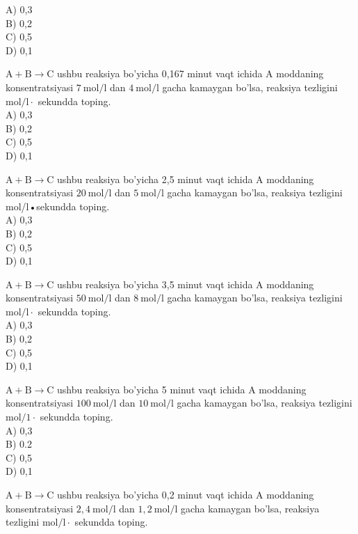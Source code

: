 A) 0,3\\
B) 0,2\\
C) 0,5\\
D) 0,1
  \item $\mathrm{A}+\mathrm{B} \rightarrow \mathrm{C}$ ushbu reaksiya bo'yicha 0,167 minut vaqt ichida A moddaning konsentratsiyasi $7 \mathrm{~mol} / \mathrm{l}$ dan $4 \mathrm{~mol} / \mathrm{l}$ gacha kamaygan bo'lsa, reaksiya tezligini $\mathrm{mol} / \mathrm{l} \cdot$ sekundda toping.\\
A) 0,3\\
B) 0,2\\
C) 0,5\\
D) 0,1
  \item $\mathrm{A}+\mathrm{B} \rightarrow \mathrm{C}$ ushbu reaksiya bo'yicha 2,5 minut vaqt ichida A moddaning konsentratsiyasi $20 \mathrm{~mol} / \mathrm{l}$ dan $5 \mathrm{~mol} / \mathrm{l}$ gacha kamaygan bo'lsa, reaksiya tezligini mol/l•sekundda toping.\\
A) 0,3\\
B) 0,2\\
C) 0,5\\
D) 0,1
  \item $\mathrm{A}+\mathrm{B} \rightarrow \mathrm{C}$ ushbu reaksiya bo'yicha 3,5 minut vaqt ichida A moddaning konsentratsiyasi $50 \mathrm{~mol} / \mathrm{l}$ dan $8 \mathrm{~mol} / \mathrm{l}$ gacha kamaygan bo'lsa, reaksiya tezligini $\mathrm{mol} / \mathrm{l} \cdot$ sekundda toping.\\
A) 0,3\\
B) 0,2\\
C) 0,5\\
D) 0,1
  \item $\mathrm{A}+\mathrm{B} \rightarrow \mathrm{C}$ ushbu reaksiya bo'yicha 5 minut vaqt ichida A moddaning\\
konsentratsiyasi $100 \mathrm{~mol} / \mathrm{l}$ dan $10 \mathrm{~mol} / \mathrm{l}$ gacha kamaygan bo'lsa, reaksiya tezligini $\mathrm{mol} / 1 \cdot$ sekundda toping.\\
A) 0,3\\
B) 0.2\\
C) 0,5\\
D) 0,1
  \item $\mathrm{A}+\mathrm{B} \rightarrow \mathrm{C}$ ushbu reaksiya bo'yicha 0,2 minut vaqt ichida A moddaning konsentratsiyasi $2,4 \mathrm{~mol} / \mathrm{l}$ dan $1,2 \mathrm{~mol} / \mathrm{l}$ gacha kamaygan bo'lsa, reaksiya tezligini $\mathrm{mol} / \mathrm{l} \cdot$ sekundda toping.\\
